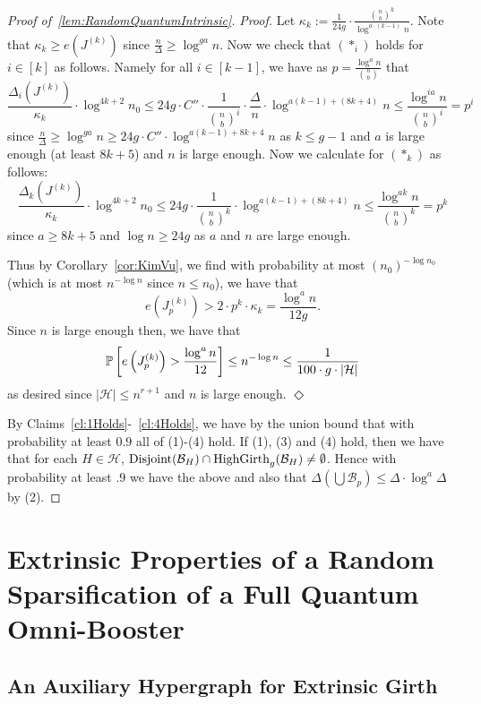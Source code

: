 \documentclass[11pt]{article}
\newcommand{\mc}[1]{\mathcal{#1}}
\newcounter{i}
\theoremstyle{plain}
\newenvironment{proofclaim}[1][]%
{\noindent \emph{Proof.} {}{#1}{}}{\hfill
	$\Diamond$\vspace{1em}}
\renewcommand{\theclaim}{\thetheorem.\arabic{claim}}
\newenvironment{lateproof}[1]
 {%
  \renewcommand{\theclaim}{\ref{#1}.\arabic{claim}}%
  \begin{proof}[Proof of~\cref{#1}]%
 }
 {\end{proof}}
\theoremstyle{plain} %
\theoremstyle{definition}
\newcommand{\Prob}[1]{\ensuremath{%
\mathbb P\left[#1\right]
}}
\begin{document}
\begin{lateproof}{lem:RandomQuantumIntrinsic}
\begin{proofclaim}
Let $\kappa_k:= \frac{1}{24g} \cdot \frac{\binom{n}{b}^k}{\log^{a\cdot (k-1)} n}$. Note that $\kappa_k\ge e\left(J^{(k)}\right)$ since $\frac{n}{\Delta} \ge \log^{ga} n$. Now we check that $(*_i)$ holds for $i\in [k]$ as follows. Namely for all $i\in [k-1]$, we have as $p=\frac{\log^a n}{\binom{n}{b}}$ that
$$\frac{\Delta_i\left(J^{(k)}\right)}{\kappa_k}\cdot \log^{4k+2}n_0\le 24g\cdot C''\cdot \frac{1}{\binom{n}{b}^i}\cdot \frac{\Delta}{n} \cdot \log^{a(k-1)+(8k+4)}n \le \frac{\log^{ia} n}{\binom{n}{b}^i} = p^i$$ since $\frac{n}{\Delta} \ge \log^{ga}{n} \ge 24g\cdot C''\cdot \log^{a(k-1)+8k+4} n$ as  $k\le g-1$ and $a$ is large enough (at least $8k+5$) and $n$ is large enough. Now we calculate for $(*_k)$ as follows:
$$\frac{\Delta_k\left(J^{(k)}\right)}{\kappa_k}\cdot \log^{4k+2}n_0\le 24g\cdot \frac{1}{\binom{n}{b}^k}\cdot \log^{a(k-1)+(8k+4)}n \le \frac{\log^{ak} n}{\binom{n}{b}^k} = p^k$$ since $a\ge 8k+5$ and $\log n \ge 24g$ as $a$ and $n$ are large enough.

Thus by Corollary~\ref{cor:KimVu}, we find with probability at most
$(n_0)^{-\log n_0}$ (which is at most $n^{-\log n}$ since $n\le n_0$), we have that
$$e\left(J^{(k)}_p\right) > 2\cdot p^k\cdot \kappa_k = \frac{\log^{a} n}{12g}.$$ 
Since $n$ is large enough then, we have that
$$\Prob{e\left(J^{(k)}_p\right) > \frac{\log^{a} n}{12}} \le n^{-\log n} \le  \frac{1}{100\cdot g\cdot |\mc{H}|}$$
as desired since $|\mc{H}| \le n^{r+1}$ and $n$ is large enough.
\end{proofclaim}

By Claims~\ref{cl:1Holds}-~\ref{cl:4Holds}, we have by the union bound that with probability at least $0.9$ all of (1)-(4) hold. If (1), (3) and (4) hold, then we have that for each $H\in \mathcal{H}$, ${\rm Disjoint}(\mc{B}_H) \cap {\rm HighGirth}_g(\mc{B}_H) \ne \emptyset$. Hence with probability at least $.9$ we have the above and also that $\Delta(\bigcup \mc{B}_p)\le \Delta\cdot \log^{a} \Delta$ by (2).
\end{lateproof}

\section{Extrinsic Properties of a Random Sparsification of a Full Quantum Omni-Booster}\label{s:Extrinsic}

\subsection{An Auxiliary Hypergraph for Extrinsic Girth}
\end{document}
